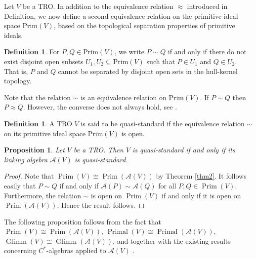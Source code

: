 \documentclass{birkjour}
\newtheorem{prop}[thm]{Proposition}
\theoremstyle{definition}
\newtheorem{defn}[thm]{Definition}
\theoremstyle{remark}
\numberwithin{equation}{section}
\begin{document}
Let \(V\) be a TRO. In addition to the equivalence relation \(\approx\) introduced in Definition, we now define a second equivalence relation on the primitive ideal space \(\mathrm{Prim}(V)\), based on the topological separation properties of primitive ideals.

\begin{defn}
For \(P, Q \in \mathrm{Prim}(V)\), we write $
P \sim Q$
if and only if there do not exist disjoint open subsets \(U_1, U_2 \subseteq \mathrm{Prim}(V)\) such that \(P \in U_1\) and \(Q \in U_2\). That is, \(P\) and \(Q\) cannot be separated by disjoint open sets in the hull-kernel topology.
\end{defn}

Note that the relation \(\sim\) is an equivalence relation on \(\mathrm{Prim}(V)\). If \(P \sim Q\)  then  \(P \approx Q\). However, the converse does not always hold, see \cite{qs1991}.

\begin{defn}
    

A TRO \( V \) is said to be quasi-standard if the equivalence relation
$\sim$
on its primitive ideal space \( \mathrm{Prim}(V) \) is open.  
\end{defn}








\begin{prop}
    Let \( V \) be a TRO. Then \( V \) is quasi-standard if and only if its linking algebra \( \mathcal{A}(V) \) is quasi-standard.
\end{prop}

\begin{proof}
Note that $\operatorname{Prim}(V) \cong \operatorname{Prim}(\mathcal{A}(V))$ by Theorem \ref{thm2}. It follows easily that $P \sim Q$ if and only if $\mathcal{A}(P)\sim \mathcal{A}(Q) $ for all $P,Q\in \operatorname{Prim}(V) $.  Furthermore, the relation \(\sim\) is open on \(\operatorname{Prim}(V)\) if and only if it is open on \(\operatorname{Prim}(\mathcal{A}(V))\). Hence the result follows.
\end{proof}


The following proposition follows from the fact that $\operatorname{Prim}(V) \cong \operatorname{Prim}(\mathcal{A}(V))$, $\operatorname{Primal}(V) \cong \operatorname{Primal}(\mathcal{A}(V))$, $\operatorname{Glimm}(V) \cong \operatorname{Glimm}(\mathcal{A}(V))$, and together with the  existing results concerning $C^*$-algebras applied to $\mathcal{A}(V)$ \cite{qs1991}.
\end{document}
